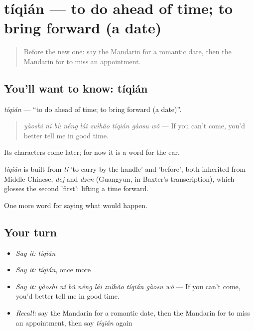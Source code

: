 \section[tíqián]{tíqián — to do ahead of time; to bring forward (a date)}

\label{lesson:ZH-C388-tiqian}



\begin{quote}
Before the new one: say the Mandarin for a romantic date, then the Mandarin for to miss an appointment.
\end{quote}

\subsection*{You'll want to know: tíqián}
\emph{tíqián} — \textquotedblleft{}to do ahead of time; to bring forward (a date)\textquotedblright{}.

\begin{quote}
\emph{yàoshi nǐ bù néng lái zuìhǎo tíqián gàosu wǒ} — If you can't come, you'd better tell me in good time.
\end{quote}

Its characters come later; for now it is a word for the ear.

\begin{cousinweb}
\emph{tíqián} is built from \emph{tí} 'to carry by the handle' and  'before', both inherited from Middle Chinese, \emph{dej} and \emph{dzen} (Guangyun, in Baxter's transcription), which glosses the second 'first': lifting a time forward.
\end{cousinweb}

\begin{grammarlens}[title={What you've built}]
One more word for saying what would happen.
\end{grammarlens}

\subsection*{Your turn}
\begin{itemize}
\raggedright
  \item \emph{Say it:} \emph{tíqián}
  \item \emph{Say it:} \emph{tíqián}, once more
  \item \emph{Say it:} \emph{yàoshi nǐ bù néng lái zuìhǎo tíqián gàosu wǒ} — If you can't come, you'd better tell me in good time.
  \item \emph{Recall:} say the Mandarin for a romantic date, then the Mandarin for to miss an appointment, then say \emph{tíqián} again
\end{itemize}

